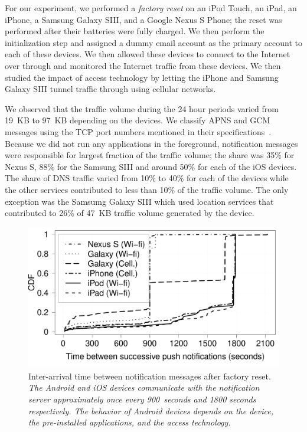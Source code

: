For our experiment, we performed a \emph{factory reset} on an iPod Touch, an iPad, an iPhone, a Samsung Galaxy SIII, and a Google Nexus S Phone; the reset was performed after their batteries were fully charged. 
We then perform the initialization step and assigned a dummy email account as the primary account to each of these devices.
We then allowed these devices to connect to the Internet over \wifi through \platname and monitored the Internet traffic from these devices.
We then studied the impact of access technology by letting the iPhone and Samsung Galaxy SIII tunnel traffic through \platname using cellular networks. 

We observed that the traffic volume during the 24 hour periods varied from 19~KB to 97~KB depending on the devices. 
We classify APNS and GCM messages using the TCP port numbers mentioned in their specifications~\cite{gcm, apns}.
Because we did not run any applications in the foreground, notification messages were responsible for largest fraction of the traffic volume; the share was 35\% for Nexus S, 88\% for the Samsung SIII and around 50\% for each of the iOS devices. 
The share of DNS traffic varied from 10\% to 40\% for each of the devices while the other services contributed to less than 10\% of the traffic volume.
The only exception was the Samsumg Galaxy SIII which used location services that contributed to 26\% of 47~KB traffic volume generated by the device.

\begin{figure}
\centering
\includegraphics[width=\columnwidth]{plots/push_factoryreset_interarrival_distrib.pdf}
\caption{Inter-arrival time between notification messages after factory reset. \emph{The Android and iOS devices communicate with the notification server approximately once every 900~seconds and 1800 seconds respectively. The behavior of Android devices depends on the device, the pre-installed applications, and the access technology.}}
\label{fig:push-expt-interarrival}
\end{figure}

